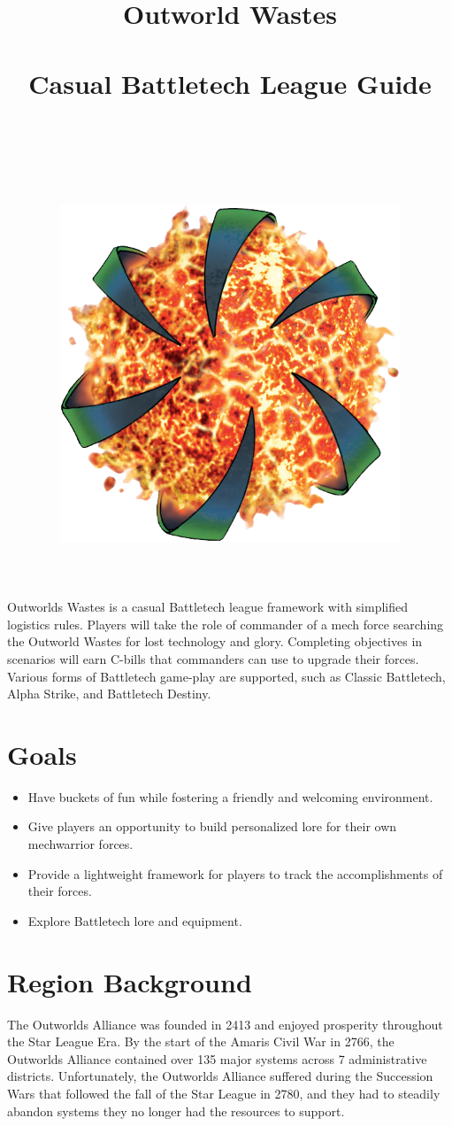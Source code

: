 \documentclass[UTF8]{article}
\title{
  Outworld Wastes\\
  ~\\
  \large Casual Battletech League Guide \\
  ~\\
  ~\\
  ~\\
  \includegraphics[width=4in]{img/Outworlds_Alliance.png}
}
\author{}
\date{}
\begin{document}
\maketitle

\newpage

Outworlds Wastes is a casual Battletech league framework with simplified logistics rules.
Players will take the role of commander of a mech force searching the Outworld Wastes for lost technology and glory.
Completing objectives in scenarios will earn C-bills that commanders can use to upgrade their forces.
Various forms of Battletech game-play are supported, such as Classic Battletech, Alpha Strike, and Battletech Destiny.\\

\section*{Goals}

\begin{itemize}

\item Have buckets of fun while fostering a friendly and welcoming environment.

\item Give players an opportunity to build personalized lore for their own mechwarrior forces.

\item Provide a lightweight framework for players to track the accomplishments of their forces.

\item Explore Battletech lore and equipment.

\end{itemize}

\newpage

\section{Region Background}

The Outworlds Alliance was founded in 2413 and enjoyed prosperity throughout the Star League Era.
By the start of the Amaris Civil War in 2766, the Outworlds Alliance contained over 135 major systems across 7 administrative districts.
Unfortunately, the Outworlds Alliance suffered during the Succession Wars that followed the fall of the Star League in 2780, and they had to steadily abandon systems they no longer had the resources to support.\\
\end{document}
